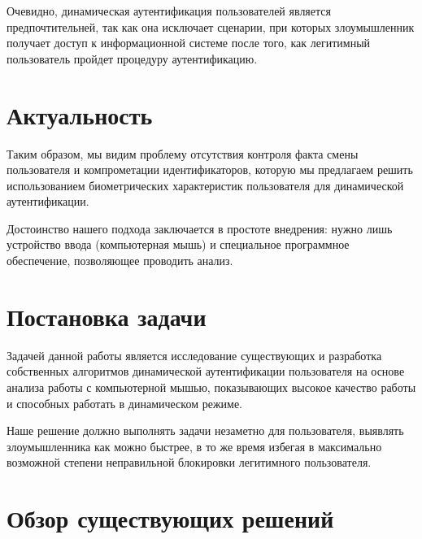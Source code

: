 \documentclass[12pt]{article}
\begin{document}
    \par Очевидно, динамическая аутентификация пользователей является предпочтительней, так как она исключает сценарии, при которых злоумышленник получает доступ к информационной системе после того, как легитимный пользователь пройдет процедуру аутентификацию.

    \newpage



    \section{Актуальность}
    \label{sec:Relevance}

    \par Таким образом, мы видим проблему отсутствия контроля факта смены пользователя и компрометации идентификаторов, которую мы предлагаем решить использованием биометрических характеристик пользователя для динамической аутентификации. \\

    \par Достоинство нашего подхода заключается в простоте внедрения: нужно лишь устройство ввода (компьютерная мышь) и специальное программное обеспечение, позволяющее проводить анализ.

    \newpage



    \section{Постановка задачи}
    \label{sec:FormulationOfProblem}
    
    \par Задачей данной работы является исследование существующих и разработка собственных алгоритмов динамической аутентификации пользователя на основе анализа работы с компьютерной мышью, показывающих высокое качество работы и способных работать в динамическом режиме. \\
    \par Наше решение должно выполнять задачи незаметно для пользователя, выявлять злоумышленника как можно быстрее, в то же время избегая в максимально возможной степени неправильной блокировки легитимного пользователя.

    \newpage



    \section{Обзор существующих решений}
    \label{sec:Overview}
\end{document}
